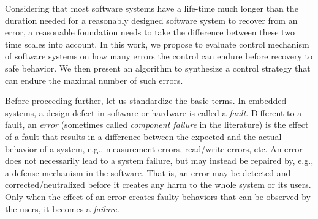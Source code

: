 \documentclass[times,10pt,twocolumn]{article}
\begin{document}
Considering that most software systems have a life-time much longer 
than the duration needed for a reasonably designed software system to recover from an error, 
a reasonable foundation needs to take the difference between these two time scales into account. 
In this work, \label{reply1.less.errors.more.resilient}
we propose to evaluate control mechanism 
of software systems on 
how many errors the control can endure before recovery to safe behavior. 
We then present an algorithm to synthesize a control strategy
that can endure the maximal number of such errors.  





Before proceeding further, let us standardize the basic terms. 
In embedded systems, a design defect in software or hardware is called a {\em fault}.  
Different to a fault, an {\em error} (sometimes called {\em component failure} in the literature) is the effect of a fault that results in a difference between the expected and the actual behavior of a system, e.g., measurement errors, read/write errors, etc.
An error does not necessarily lead to a system failure, but may instead be repaired 
by, e.g., a defense mechanism in the software.
That is, an error may be detected and corrected/neutralized before 
it creates any harm to the whole system or its users.  
Only when the effect of an error creates faulty behaviors that 
can be observed by the users, it becomes a {\em failure}.  
\end{document}
